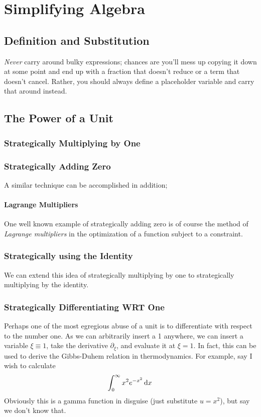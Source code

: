 \chapter{Simplifying Algebra}
\section{Definition and Substitution}
\emph{Never} carry around bulky expressions; chances are you'll mess up copying it down at some point and end up with a fraction that doesn't reduce or a term that doesn't cancel. Rather, you should always define a placeholder variable and carry that around instead.


\section{The Power of a Unit}
\subsection{Strategically Multiplying by One}
\subsection{Strategically Adding Zero}
A similar technique can be accomplished in addition;

\subsubsection{Lagrange Multipliers}
One well known example of strategically adding zero is of course the method of \emph{Lagrange multipliers} in the optimization  of a function subject to a constraint.

\subsection{Strategically using the Identity}
We can extend this idea of strategically multiplying by one to strategically multiplying by the identity.

\subsection{Strategically Differentiating WRT One}
Perhaps one of the most egregious abuse of a unit is to differentiate with respect to the number one. As we can arbitrarily insert a 1 anywhere, we can insert a variable \(\xi \equiv 1\), take the derivative \(\partial_\xi\), and evaluate it at \(\xi = 1\). In fact, this can be used to derive the Gibbs-Duhem relation in thermodynamics. For example, say I wish to calculate
\[\int_0^\infty x^2e^{-x^2}\d{x}\]
Obviously this is a gamma function in disguise (just substitute \(u=x^2\)), but say we don't know that.


